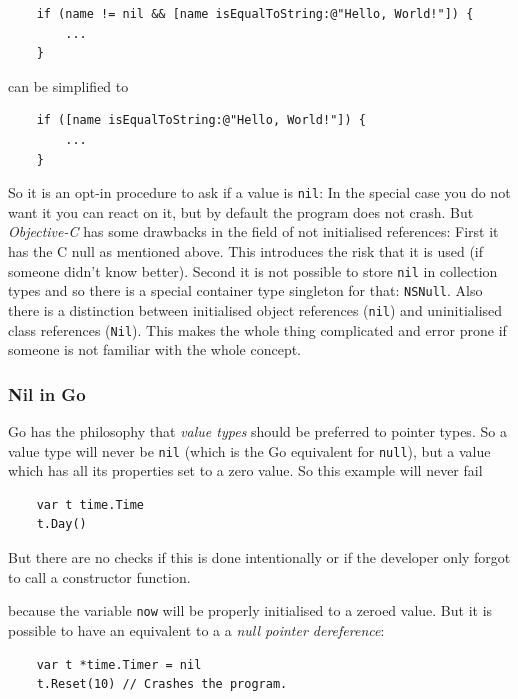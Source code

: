 \documentclass[12pt,a4paper]{report}
\begin{document}
\begin{verbatim}
    if (name != nil && [name isEqualToString:@"Hello, World!"]) {
        ... 
    }
\end{verbatim}

\noindent can be simplified to

\begin{verbatim}
    if ([name isEqualToString:@"Hello, World!"]) { 
        ... 
    }
\end{verbatim}

\noindent So it is an opt-in procedure to ask if a value is \texttt{nil}: In the special case you do not want it you can react on it, but by default the program does not crash. But \textit{Objective-C} has some drawbacks in the field of not initialised references: First it has the C null as mentioned above. This introduces the risk that it is used (if someone didn't know better). Second it is not possible to store \texttt{nil} in collection types and so there is a special container type singleton for that: \texttt{NSNull}. Also there is a distinction between initialised object references (\texttt{nil}) and uninitialised class references (\texttt{Nil}). This makes the whole thing complicated and error prone if someone is not familiar with the whole concept.

\subsubsection{Nil in Go}
Go has the philosophy that \textit{value types} should be preferred to pointer types. So a value type will never be \texttt{nil} (which is the Go equivalent for \texttt{null}), but a value which has all its properties set to a zero value\cite{golang-spec}. So this example will never fail

\begin{verbatim}
    var t time.Time
    t.Day()
\end{verbatim}

But there are no checks if this is done intentionally or if the developer only forgot to call a constructor function.

because the variable \texttt{now} will be properly initialised to a zeroed value. But it is possible to have an equivalent to a a \textit{null pointer dereference}:

\begin{verbatim}
    var t *time.Timer = nil
    t.Reset(10) // Crashes the program.
\end{verbatim}
\end{document}
